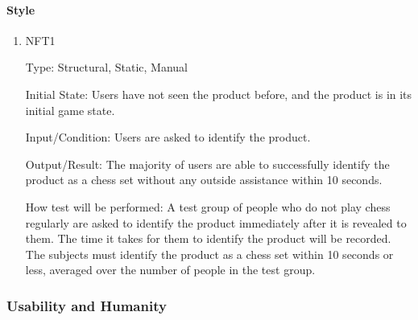 \documentclass[12pt, titlepage]{article}
\begin{document}
\paragraph{Style}
\begin{enumerate}
    \item{NFT1}

        Type: Structural, Static, Manual
                            
        Initial State: Users have not seen the product before, and the product is in its initial game state.
                            
        Input/Condition: Users are asked to identify the product.
                            
        Output/Result: The majority of users are able to successfully identify the product as a chess set without any outside assistance within 10 seconds.
                            
        How test will be performed: A test group of people who do not play chess regularly are asked to identify the product immediately after it is revealed to them.
            The time it takes for them to identify the product will be recorded. The subjects must identify the product as a chess set within 10 seconds or less, averaged
            over the number of people in the test group.
\end{enumerate}

\subsubsection{Usability and Humanity}
\end{document}
